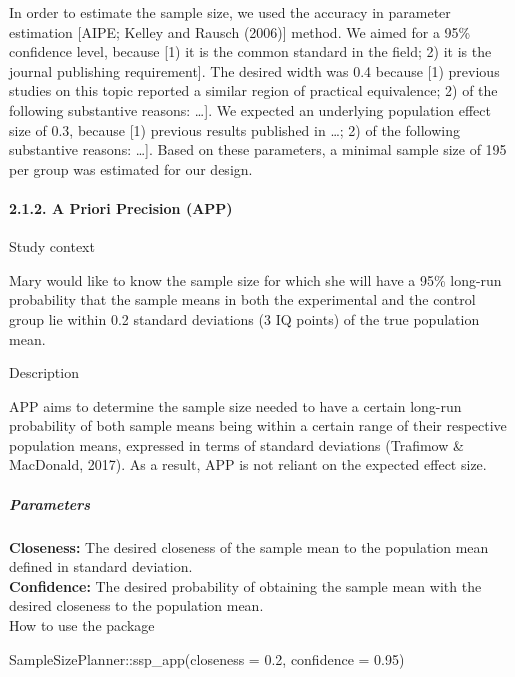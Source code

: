 \documentclass[
  english,
  man,floatsintext]{apa6}
\newenvironment{Shaded}{\begin{snugshade}}{\end{snugshade}}
\newcommand{\AttributeTok}[1]{\textcolor[rgb]{0.77,0.63,0.00}{#1}}
\newcommand{\FloatTok}[1]{\textcolor[rgb]{0.00,0.00,0.81}{#1}}
\newcommand{\FunctionTok}[1]{\textcolor[rgb]{0.00,0.00,0.00}{#1}}
\newcommand{\NormalTok}[1]{#1}
\newcommand{\SpecialCharTok}[1]{\textcolor[rgb]{0.00,0.00,0.00}{#1}}
\let\oldparagraph\paragraph
\renewcommand{\paragraph}[1]{\oldparagraph{#1}\mbox{}}
\let\oldsubparagraph\subparagraph
\renewcommand{\subparagraph}[1]{\oldsubparagraph{#1}\mbox{}}
\begin{document}
In order to estimate the sample size, we used the accuracy in parameter estimation {[}AIPE; Kelley and Rausch (2006){]} method. We aimed for a 95\% confidence level, because {[}1) it is the common standard in the field; 2) it is the journal publishing requirement{]}. The desired width was 0.4 because {[}1) previous studies on this topic reported a similar region of practical equivalence; 2) of the following substantive reasons: \ldots{]}. We expected an underlying population effect size of 0.3, because {[}1) previous results published in \ldots; 2) of the following substantive reasons: \ldots{]}. Based on these parameters, a minimal sample size of 195 per group was estimated for our design.

\hypertarget{a-priori-precision-app}{%
\paragraph{2.1.2. A Priori Precision (APP)}\label{a-priori-precision-app}}

Study context

Mary would like to know the sample size for which she will have a 95\% long-run probability that the sample means in both the experimental and the control group lie within 0.2 standard deviations (3 IQ points) of the true population mean.

Description

APP aims to determine the sample size needed to have a certain long-run probability of both sample means being within a certain range of their respective population means, expressed in terms of standard deviations (Trafimow \& MacDonald, 2017). As a result, APP is not reliant on the expected effect size.

\hypertarget{parameters-7}{%
\subparagraph{Parameters}\label{parameters-7}}

\textbf{Closeness:} The desired closeness of the sample mean to the population mean defined in standard deviation.\\
\textbf{Confidence:} The desired probability of obtaining the sample mean with the desired closeness to the population mean.\\

How to use the package

\begin{Shaded}
\begin{Highlighting}[]
\NormalTok{SampleSizePlanner}\SpecialCharTok{::}\FunctionTok{ssp\_app}\NormalTok{(}\AttributeTok{closeness =} \FloatTok{0.2}\NormalTok{, }\AttributeTok{confidence =} \FloatTok{0.95}\NormalTok{)}
\end{Highlighting}
\end{Shaded}
\end{document}
